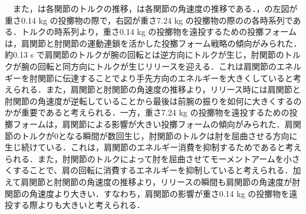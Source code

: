 \begin{small}
　また，は各関節のトルクの推移，は各関節の角速度の推移である．，の左図が重さ0.14 kg の投擲物の際で，右図が重さ7.24 kg の投擲物の際のの各時系列である．トルクの時系列より，重さ0.14 kg の投擲物を遠投するための投擲フォームは，肩関節と肘関節の運動連鎖を活かした投擲フォーム戦略の傾向がみられた．約0.13 s で肩関節のトルクが腕の回転とは逆方向にトルクが生じ，肘関節のトルクが腕の回転と同方向にトルクが生じリリースを迎える．これは肩関節のエネルギーを肘関節に伝達することでより手先方向のエネルギーを大きくしていると考えられる．また，肩関節と肘関節の角速度の推移より，リリース時には肩関節と肘関節の角速度が逆転していることから最後は前腕の振りを如何に大きくするのかが重要であると考えられる．一方，重さ7.24 kg の投擲物を遠投するための投擲フォームは，肩関節による影響が大きい投擲フォームの傾向がみられた．肩関節のトルクが0となる瞬間が数回生じ，肘関節のトルクは肘を屈曲させる方向に生じ続けている．これは，肩関節のエネルギー消費を抑制するためであると考えられる．また，肘関節のトルクによって肘を屈曲させてモーメントアームを小さくすることで、肩の回転に消費するエネルギーを抑制していると考えられる．加えて肩関節と肘関節の角速度の推移より，リリースの瞬間も肩関節の角速度が肘関節の角速度より大きい．すなわち，肩関節の影響が重さ0.14 kg の投擲物を遠投する際よりも大きいと考えられる．

\end{small}

